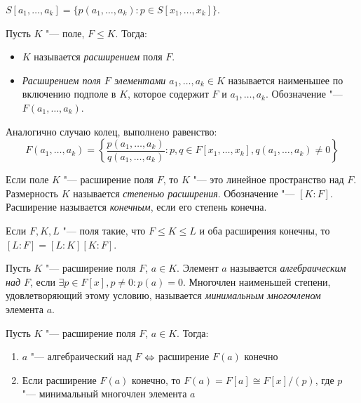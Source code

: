 \begin{note}
	$S[a_1, \dotsc, a_k] = \{p(a_1, \dotsc, a_k) : p \in S[x_1, \dotsc, x_k]\}$.
\end{note}

\begin{definition}
	Пусть $K$ "--- поле, $F \le K$. Тогда:
	\begin{itemize}
		\item $K$ называется \textit{расширением} поля $F$.
		\item \textit{Расширением поля $F$ элементами $a_1, \dotsc, a_k \in K$} называется наименьшее по включению подполе в $K$, которое содержит $F$ и $a_1, \dotsc, a_k$. Обозначение "--- $F(a_1, \dotsc, a_k)$.
	\end{itemize}
\end{definition}

\begin{note}
	Аналогично случаю колец, выполнено равенство:
	\[F(a_1, \dotsc, a_k) = \left\{\frac{p(a_1, \dotsc, a_k)}{q(a_1, \dotsc, a_k)} : p, q \in F[x_1, \dotsc, x_k], q(a_1, \dotsc, a_k) \ne 0\right\}\]
\end{note}

\begin{definition}
	Если поле $K$ "--- расширение поля $F$, то $K$ "--- это линейное пространство над $F$. Размерность $K$ называется \textit{степенью расширения}. Обозначение "--- $[K : F]$. Расширение называется \textit{конечным}, если его степень конечна.
\end{definition}

\begin{note}
	Если $F, K, L$ "--- поля такие, что $F \le K \le L$ и оба расширения конечны, то $[L : F] = [L : K][K : F]$.
\end{note}

\begin{definition}
	Пусть $K$ "--- расширение поля $F$, $a \in K$. Элемент $a$ называется \textit{алгебраическим над $F$}, если $\exists p \in F[x], p \ne 0: p(a) = 0$. Многочлен наименьшей степени, удовлетворяющий этому условию, называется \textit{минимальным многочленом} элемента $a$.
\end{definition}

\begin{theorem}
	Пусть $K$ "--- расширение поля $F$, $a \in K$. Тогда:
	\begin{enumerate}
		\item $a$ "--- алгебраический над $F$ $\Leftrightarrow$ расширение $F(a)$ конечно
		\item Если расширение $F(a)$ конечно, то $F(a) = F[a] \cong F[x] / (p)$, где $p$ "--- минимальный многочлен элемента $a$
	\end{enumerate}
\end{theorem}

